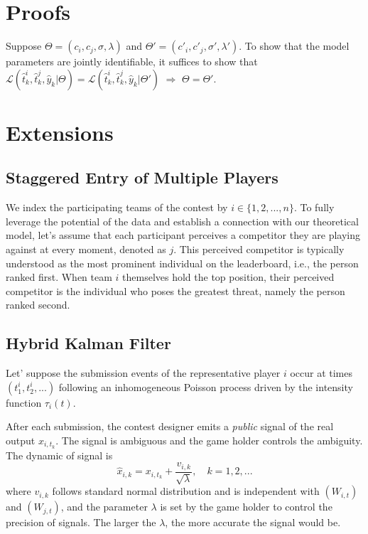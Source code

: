 \documentclass[mnsc]{informs3}
\begin{document}
\begin{APPENDICES}


\section{Proofs}

Suppose $\Theta = (c_i, c_j, \sigma, \lambda)$ and $\Theta' = (c'_i, c'_j, \sigma', \lambda')$. 
To show that the model parameters are jointly identifiable, it suffices to show that $\mathcal{L}(\hat{t}^i_k, \hat{t}^j_k, \hat{y}_k | \Theta) = \mathcal{L}(\hat{t}^i_k, \hat{t}^j_k, \hat{y}_k | \Theta')$ $\Rightarrow$ $\Theta = \Theta'$. 
\Halmos
\endproof



\section{Extensions}

\subsection{Staggered Entry of Multiple Players}
\label{sect-extension}

We index the participating teams of the contest by $i\in\{1, 2, ..., n\}$. 
To fully leverage the potential of the data and establish a connection with our theoretical model, let's assume that each participant perceives a competitor they are playing against at every moment, denoted as $j$. 
This perceived competitor is typically understood as the most prominent individual on the leaderboard, i.e., the person ranked first.
When team $i$ themselves hold the top position, their perceived competitor is the individual who poses the greatest threat, namely the person ranked second.

\subsection{Hybrid Kalman Filter}
\label{sect-kalman-filter}

Let' suppose the submission events of the representative player $i$ occur at times $(t^i_1, t^i_2, ...)$ following an inhomogeneous Poisson process driven by the intensity function $\tau_i(t)$. 

After each submission, the contest designer emits a \textit{public} signal of the real output $x_{i,t_k}$. 
The signal is ambiguous and the game holder controls the ambiguity. 
The dynamic of signal is 
\begin{equation}\label{signal}
	\hat{x}_{i,k} = x_{i,t_k} + \frac{v_{i,k}}{\sqrt{\lambda}}, \quad k=1, 2, ...
\end{equation}
where $v_{i,k}$ follows standard normal distribution and is independent with $(W_{i,t})$ and $(W_{j,t})$, and the parameter $\lambda$ is set by the game holder to control the precision of signals. 
The larger the $\lambda$, the more accurate the signal would be. 


\end{APPENDICES}
\end{document}
